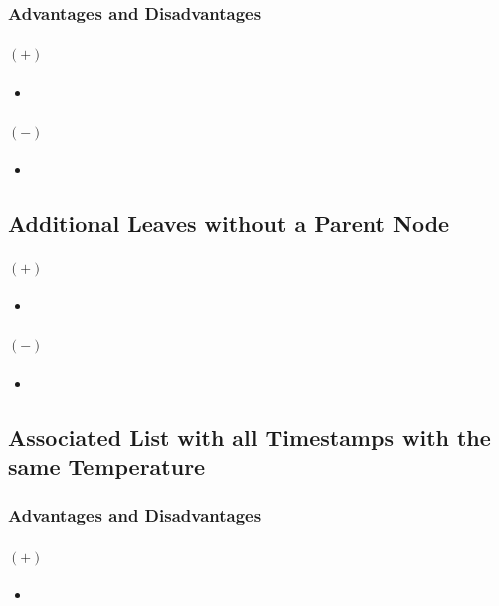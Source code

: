 \documentclass[abstracton,12pt]{scrreprt}
\begin{document}
\subsubsection{Advantages and Disadvantages}
\paragraph{$(+)$}
\begin{itemize}  
	\item  
\end{itemize}
\paragraph{$(-)$}
\begin{itemize}  
	\item  
\end{itemize}



\subsection{Additional Leaves without a Parent Node}
\paragraph{$(+)$}
\begin{itemize}  
	\item  
\end{itemize}
\paragraph{$(-)$}
\begin{itemize}  
	\item  
\end{itemize}


\subsection{Associated List with all Timestamps with the same Temperature}
\subsubsection{Advantages and Disadvantages}
\paragraph{$(+)$}
\begin{itemize}  
	\item  
\end{itemize}
\end{document}
